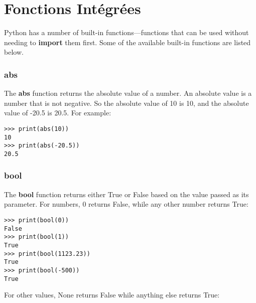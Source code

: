 



\chapter{Fonctions Intégrées}\label{app:fonctionsintégrées}

Python has a number of built-in functions---functions that can be used without needing to \textbf{import} them first.  Some of the available built-in functions are listed below.

\subsection*{abs}

The \textbf{abs} function returns the absolute value of a number.  An absolute value is a number that is not negative.  So the absolute value of 10 is 10, and the absolute value of -20.5 is 20.5.  For example:

\begin{listing}
\begin{verbatim}
>>> print(abs(10))
10
>>> print(abs(-20.5))
20.5
\end{verbatim}
\end{listing}

\subsection*{bool}

The \textbf{bool} function returns either True or False based on the value passed as its parameter. For numbers, 0 returns False, while any other number returns True:

\begin{listing}
\begin{verbatim}
>>> print(bool(0))
False
>>> print(bool(1))
True
>>> print(bool(1123.23))
True
>>> print(bool(-500))
True
\end{verbatim}
\end{listing}

For other values, None returns False while anything else returns True:

